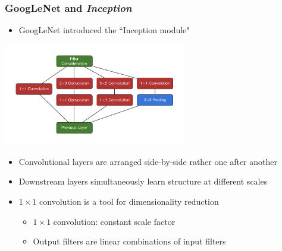 \documentclass[10pt,professionalfonts,xcolor=table]{beamer}
\begin{document}
\begin{frame}
\frametitle{GoogLeNet and \textit{Inception}}

  \begin{itemize}
  \item GoogLeNet introduced the ``Inception module"
  \end{itemize}
  \begin{center}
 \includegraphics[width=0.6\textwidth]{figures/figures/inception/inception.pdf}
 \end{center}
   \begin{itemize}
  \item Convolutional layers are arranged side-by-side rather one after another
  \item Downstream layers simultaneously learn structure at different scales
  \item $1\times1$ convolution is a tool for dimensionality reduction
    \begin{itemize}
    \item $1\times1$ convolution: constant scale factor
    \item Output filters are linear combinations of input filters
    \end{itemize}
  \end{itemize}

\end{frame}
\end{document}

